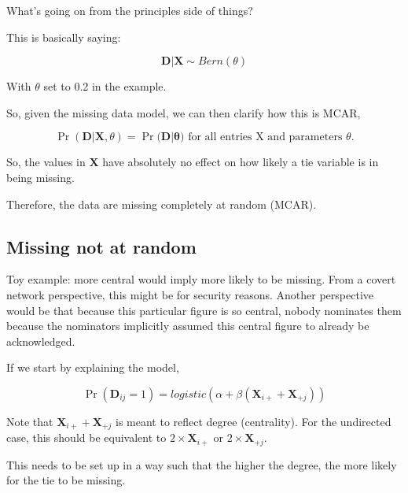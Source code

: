 \documentclass[
]{article}
\begin{document}
What's going on from the principles side of things?

This is basically saying:

\[\mathbf{D}|\mathbf{X} \sim Bern(\theta)\]

With \(\theta\) set to 0.2 in the example.

So, given the missing data model, we can then clarify how this is MCAR,

\[\Pr(\mathbf{D}|\mathbf{X}, \theta) = \Pr(\mathbf{D|\theta)} \text{ for all entries X and parameters } \theta .\]

So, the values in \(\mathbf{X}\) have absolutely no effect on how likely
a tie variable is in being missing.

Therefore, the data are missing completely at random (MCAR).

\hypertarget{missing-not-at-random}{%
\subsection{Missing not at random}\label{missing-not-at-random}}

Toy example: more central would imply more likely to be missing. From a
covert network perspective, this might be for security reasons. Another
perspective would be that because this particular figure is so central,
nobody nominates them because the nominators implicitly assumed this
central figure to already be acknowledged.

If we start by explaining the model,

\[\Pr(\mathbf{D}_{ij} = 1) = logistic(\alpha + \beta(\mathbf{X}_{i+} + \mathbf{X}_{+j}) )\]

Note that \(\mathbf{X}_{i+} + \mathbf{X}_{+j}\) is meant to reflect
degree (centrality). For the undirected case, this should be equivalent
to \(2 \times \mathbf{X}_{i+}\) or \(2 \times \mathbf{X}_{+j}\).

This needs to be set up in a way such that the higher the degree, the
more likely for the tie to be missing.
\end{document}
